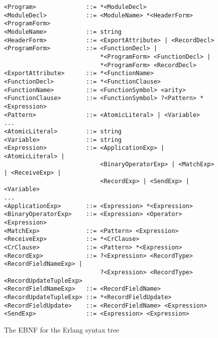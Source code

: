\begin{figure}
\footnotesize
\begin{verbatim}
<Program>              ::= *<ModuleDecl>
<ModuleDecl>           ::= <ModuleName> *<HeaderForm> <ProgramForm> 
<ModuleName>           ::= string
<HeaderForm>           ::= <ExportAttribute> | <RecordDecl>
<ProgramForm>          ::= <FunctionDecl> | 
                           *<ProgramForm> <FunctionDecl> |
                           *<ProgramForm> <RecordDecl> 
<ExportAttribute>      ::= *<FunctionName>
<FunctionDecl>         ::= *<FunctionClause>  
<FunctionName>         ::= <FunctionSymbol> <arity>
<FunctionClause>       ::= <FunctionSymbol> ?<Pattern> *<Expression>
<Pattern>              ::= <AtomicLiteral> | <Variable>
... 
<AtomicLiteral>        ::= string
<Variable>             ::= string
<Expression>           ::= <ApplicationExp> | <AtomicLiteral> |
                           <BinaryOperatorExp> | <MatchExp> | <ReceiveExp> |
                           <RecordExp> | <SendExp> | <Variable> 
...
<ApplicationExp>       ::= <Expression> *<Expression>
<BinaryOperatorExp>    ::= <Expression> <Operator> <Expression>
<MatchExp>             ::= <Pattern> <Expression>
<ReceiveExp>           ::= *<CrClause>
<CrClause>             ::= <Pattern> *<Expression>
<RecordExp>            ::= ?<Expression> <RecordType> <RecordFieldNameExp> |
                           ?<Expression> <RecordType> <RecordUpdateTupleExp>
<RecordFieldNameExp>   ::= <RecordFieldName> 
<RecordUpdateTupleExp> ::= *<RecordFieldUpdate>
<RecordFieldUpdate>    ::= <RecordFieldName> <Expression>
<SendExp>              ::= <Expression> <Expression>
\end{verbatim}
\normalsize
\caption{The EBNF for the Erlang syntax tree}
\label{fig:ESTEBNF}
\end{figure}